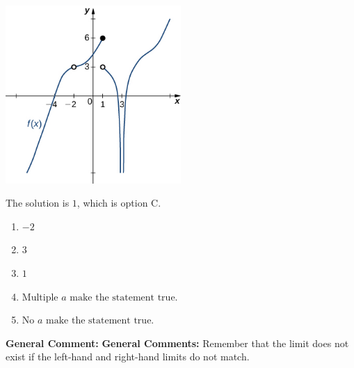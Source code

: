 \documentclass{extbook}[14pt]
\begin{document}
\begin{enumerate}
{\begin{center}
    \includegraphics[width=0.5\textwidth]{../Figures/evaluateLimitGraphicallyCopyB.png}
\end{center}


The solution is \( 1 \), which is option C.\begin{enumerate}[label=\Alph*.]
\item \( -2 \)


\item \( 3 \)


\item \( 1 \)


\item \( \text{Multiple } a \text{ make the statement true}. \)


\item \( \text{No } a \text{ make the statement true}. \)


\end{enumerate}

\textbf{General Comment:} \textbf{General Comments:} Remember that the limit does not exist if the left-hand and right-hand limits do not match.
}
\end{enumerate}
\end{document}
